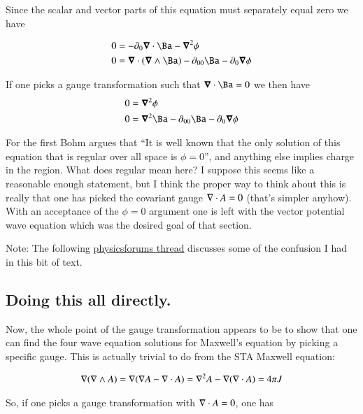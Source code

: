 \documentclass{article}
\begin{document}
Since the scalar and vector parts of this equation must separately equal zero we have

\begin{align*}
0 &= - \partial_0 \spacegrad \cdot {\Ba} - \spacegrad^2 \phi \\
0 &= \spacegrad \cdot (\spacegrad \wedge \Ba) - \partial_{00}{\Ba} - \partial_0 \spacegrad \phi  \\
\end{align*}

If one picks a gauge transformation such that $\spacegrad \cdot \Ba = 0$ we then have
\begin{align*}
0 &= \spacegrad^2 \phi \\
0 &= \spacegrad^2 \Ba - \partial_{00}{\Ba} - \partial_0 \spacegrad \phi  \\
\end{align*}

For the first Bohm argues that ``It is well known that the only solution of this equation that is regular over all space is $\phi = 0$'', and anything else implies charge in the region.  What does regular mean here?  I suppose this seems like a reasonable enough statement, but I think the proper way to think about this is really that one has picked the covariant gauge $\nabla \cdot A = 0$ (that's simpler anyhow).  With an acceptance of the $\phi =0$ argument one is left with the vector potential wave equation which was the desired goal of that section.

Note: The following \href{http://www.physicsforums.com/showthread.php?t=281874}{physicsforums thread} discusses some of the confusion I had in this bit of text.

\subsection{ Doing this all directly. }

Now, the whole point of the gauge transformation appears to be to show that one can find the four wave equation solutions for 
Maxwell's equation by picking a specific gauge.  This is actually trivial to do from the STA Maxwell equation:

\begin{align*}
\nabla (\nabla \wedge A) = \nabla( \nabla A - \nabla \cdot A ) = \nabla^2 A - \nabla (\nabla \cdot A) = 4 \pi J
\end{align*}

So, if one picks a gauge transformation with $\nabla \cdot A = 0$, one has
\end{document}
